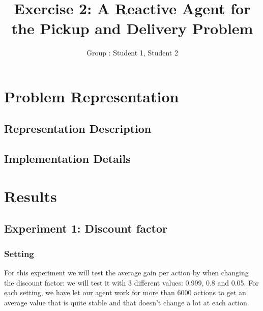 \documentclass[11pt]{article}
\title{\bf Exercise 2: A Reactive Agent for the Pickup and Delivery Problem}
\author{Group \textnumero: Student 1, Student 2}
\begin{document}
\maketitle

\section{Problem Representation}

\subsection{Representation Description}

\subsection{Implementation Details}

\section{Results}

\subsection{Experiment 1: Discount factor}

\subsubsection{Setting}
For this experiment we will test the average gain per action by when changing the discount factor: we will test it with 3 different values: 0.999, 0.8 and 0.05. For each setting, we have let our agent work for more than 6000 actions to get an average value that is quite stable and that doesn't change a lot at each action.
\end{document}
